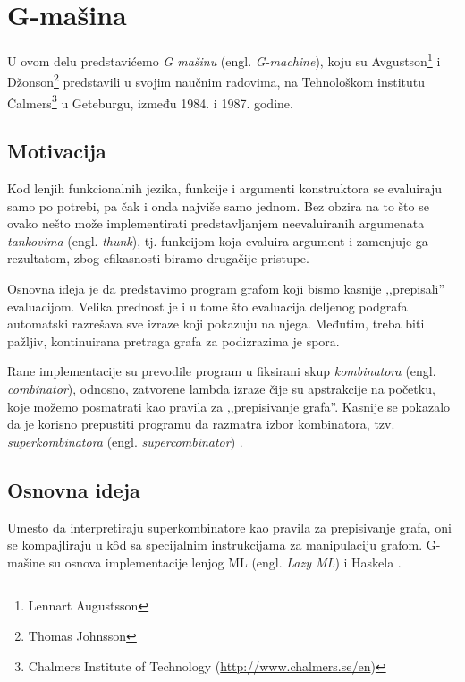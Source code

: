 \section{G-mašina}
\label{sec:Gmasine}

U ovom delu predstavićemo {\em G mašinu} (engl. \textit{G-machine}), koju su Avgustson\footnote{Lennart Augustsson} i Džonson\footnote{Thomas Johnsson} predstavili u svojim naučnim radovima, na Tehnološkom institutu Čalmers\footnote{Chalmers Institute of Technology (\url{http://www.chalmers.se/en})} u Geteburgu, između 1984. i 1987. godine. 

\subsection{Motivacija}

Kod lenjih funkcionalnih jezika, funkcije i argumenti konstruktora se evaluiraju samo po potrebi, pa čak i onda najviše samo jednom. Bez obzira na to što se ovako nešto može implementirati predstavljanjem neevaluiranih argumenata \textit{tankovima} (engl. \textit{thunk}), tj. funkcijom koja evaluira argument i zamenjuje ga rezultatom, zbog efikasnosti biramo drugačije pristupe.

Osnovna ideja je da predstavimo program grafom koji bismo kasnije ‚‚prepisali''  evaluacijom. Velika prednost je i u tome što evaluacija deljenog podgrafa automatski razrešava sve izraze koji pokazuju na njega. Međutim, treba biti pažljiv, kontinuirana pretraga grafa za podizrazima je spora.

Rane implementacije su prevodile program u fiksirani skup \textit{kombinatora} (engl. \textit{combinator}), odnosno, zatvorene lambda izraze čije su apstrakcije na početku, koje možemo posmatrati kao pravila za ‚‚prepisivanje grafa''. Kasnije se pokazalo da je korisno prepustiti programu da razmatra izbor kombinatora, tzv. {\em superkombinatora} (engl. \textit{supercombinator}) \cite{super-combinators}. %

\subsection{Osnovna ideja} 

Umesto da interpretiraju superkombinatore kao pravila za prepisivanje grafa, oni se kompajliraju u k\^ od sa specijalnim instrukcijama za manipulaciju grafom. G-mašine su osnova implementacije lenjog ML (engl. \textit{Lazy ML}) \cite{lazy-ML} i Haskela \cite{hbc}. 

